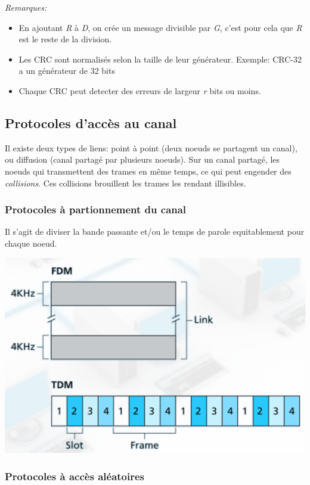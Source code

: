 \documentclass[a4paper, 12pt, french]{article}
\begin{document}
	\emph{Remarques:}
	\begin{itemize}
		\item En ajoutant \emph{R} à \emph{D}, on crée un message divisible par \emph{G}, c'est pour cela que \emph{R} est le reste de la division.
		\item Les CRC sont normalisés selon la taille de leur générateur. Exemple: CRC-32 a un générateur de 32 bits
		\item Chaque CRC peut detecter des erreurs de largeur \emph{r} bits ou moins.
	\end{itemize}

	\subsection{Protocoles d'accès au canal}

	Il existe deux types de liens: point à point (deux noeuds se partagent un canal), ou diffusion (canal partagé par plusieurs noeuds). Sur un canal partagé, les noeuds qui transmettent des trames en même temps, ce qui peut engender des \emph{collisions}. Ces collisions brouillent les trames les rendant illisibles.

	\subsubsection{Protocoles à partionnement du canal}

	Il s'agit de diviser la bande passante et/ou le temps de parole equitablement pour chaque noeud.

	\includegraphics[width=13.8cm]{reseau_partitionnement_canal}

	\subsubsection{Protocoles à accès aléatoires}
\end{document}
